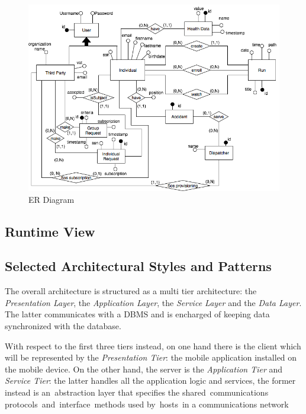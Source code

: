 \documentclass[a4paper]{article}
\begin{document}
    \begin{figure}[!htpb]
        \centering
        \includegraphics[width=\textwidth,keepaspectratio]{DD/images/er_diagram.png}
        \caption{ER Diagram}
        \label{fig:ER_trackme}
    \end{figure}
    
\newpage
\subsection{Runtime View}

\newpage
\subsection{Selected Architectural Styles and Patterns}
    The overall architecture is structured as a multi tier architecture: the \textit{Presentation Layer}, the \textit{Application Layer}, the \textit{Service Layer} and the \textit{Data Layer}. The latter communicates with a DBMS and is encharged of keeping data synchronized with the database.
    
    With respect to the first three tiers instead, on one hand there is the client which will be represented by the \textit{Presentation Tier}: the mobile application installed on the mobile device. On the other hand, the server is the \textit{Application Tier} and \textit{Service Tier}: the latter handles all the application logic and services, the former instead is an abstraction layer that specifies the shared communications protocols and interface methods used by hosts in a communications network
    
\end{document}
